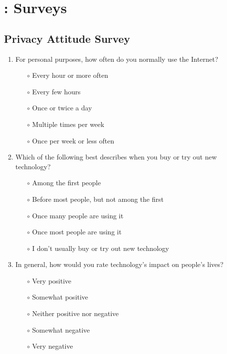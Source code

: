 \chapter{\frameworkAinur: Surveys}
\label{app:ainur-survey}

\section{Privacy Attitude Survey}
\label{appsec:privacy-attitude-survey}

\begin{enumerate}

\item For personal purposes, how often do you normally use the Internet?

\begin{itemize}
\item[$\circ$] Every hour or more often
\item[$\circ$] Every few hours
\item[$\circ$] Once or twice a day
\item[$\circ$] Multiple times per week
\item[$\circ$] Once per week or less often
\end{itemize}

\item Which of the following best describes when you buy or try out new technology?

\begin{itemize}
\item[$\circ$] Among the first people
\item[$\circ$] Before most people, but not among the first
\item[$\circ$] Once many people are using it
\item[$\circ$] Once most people are using it
\item[$\circ$] I don't usually buy or try out new technology
\end{itemize}

\item In general, how would you rate technology's impact on people's lives?

\begin{itemize}
\item[$\circ$] Very positive
\item[$\circ$] Somewhat positive
\item[$\circ$] Neither positive nor negative
\item[$\circ$] Somewhat negative
\item[$\circ$] Very negative
\end{itemize}


\end{enumerate}
